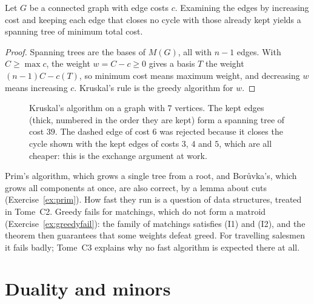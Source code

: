 \begin{corollary}[Kruskal, 1956]\label{cor:kruskal}
Let $G$ be a connected graph with edge costs $c$. Examining the edges by increasing cost and keeping each edge that closes no cycle with those already kept yields a spanning tree of minimum total cost.
\end{corollary}
\begin{proof}
Spanning trees are the bases of $M(G)$, all with $n-1$ edges. With $C\ge\max c$, the weight $w=C-c\ge0$ gives a basis $T$ the weight $(n-1)C-c(T)$, so minimum cost means maximum weight, and decreasing
$w$ means increasing $c$. Kruskal's rule is the greedy algorithm for $w$.
\end{proof}

\begin{figure}[ht]
\centering
{}
\caption{Kruskal's algorithm on a graph with $7$ vertices. The kept edges (thick, numbered in the order they are kept) form a spanning tree of cost $39$. The dashed edge of cost $6$ was rejected
because it closes the cycle shown with the kept edges of costs $3$, $4$ and $5$, which are all cheaper: this is the exchange argument at work.}
\label{fig:kruskal}
\end{figure}

Prim's algorithm, which grows a single tree from a root, and Bor\r{u}vka's, which grows all components at once, are also correct, by a lemma about cuts (Exercise~\ref{ex:prim}). How fast they run is a
question of data structures, treated in Tome~C2. Greedy fails for matchings, which do not form a matroid (Exercise~\ref{ex:greedyfail}): the family of matchings satisfies (I1) and (I2), and
the theorem then guarantees that some weights defeat greed. For travelling salesmen it fails badly; Tome~C3 explains why no fast algorithm is expected there at all.

\section{Duality and minors}


